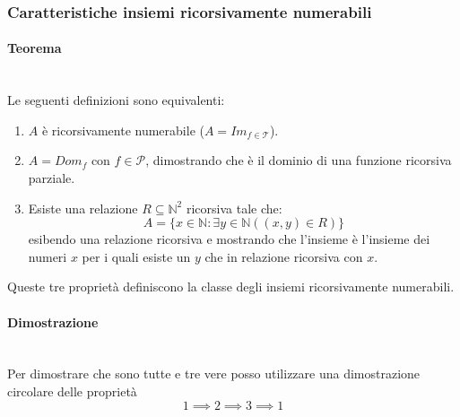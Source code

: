 \documentclass{article}
\begin{document}
\subsubsection{Caratteristiche insiemi ricorsivamente numerabili}
\paragraph{Teorema}\mbox{}\\
Le seguenti definizioni sono equivalenti:
\begin{enumerate}
    \item $A$ è ricorsivamente numerabile ($A=Im_{f\in\mathcal{T}}$).
    \item $A=Dom_f$ con $f\in\mathcal{P}$, dimostrando che è il dominio di una funzione ricorsiva parziale.
    \item Esiste una relazione $R\subseteq\mathbb{N}^2$ ricorsiva tale che:
          $$A=\{x\in\mathbb{N}:\exists y\in\mathbb{N}((x,y)\in R)\}$$
          esibendo una relazione ricorsiva e mostrando che l'insieme è l'insieme dei numeri $x$ per i quali
          esiste un $y$ che in relazione ricorsiva con $x$.
\end{enumerate}
Queste tre proprietà definiscono la classe degli insiemi ricorsivamente numerabili.
\paragraph{Dimostrazione}\mbox{}\\
Per dimostrare che sono tutte e tre vere posso utilizzare una dimostrazione circolare delle proprietà
$$1\implies 2 \implies 3\implies 1$$
\end{document}
